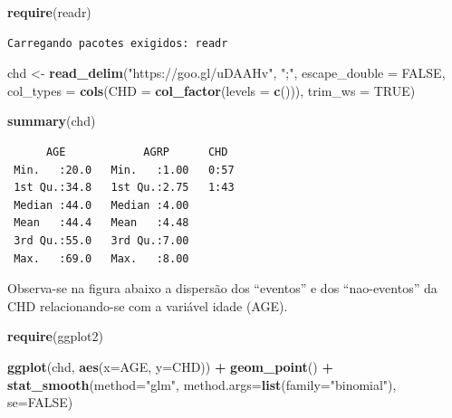 \documentclass[12pt,brazil,oneside]{book}
\newenvironment{Shaded}{\begin{snugshade}}{\end{snugshade}}
\newcommand{\DataTypeTok}[1]{\textcolor[rgb]{0.13,0.29,0.53}{#1}}
\newcommand{\KeywordTok}[1]{\textcolor[rgb]{0.13,0.29,0.53}{\textbf{#1}}}
\newcommand{\NormalTok}[1]{#1}
\newcommand{\OperatorTok}[1]{\textcolor[rgb]{0.81,0.36,0.00}{\textbf{#1}}}
\newcommand{\OtherTok}[1]{\textcolor[rgb]{0.56,0.35,0.01}{#1}}
\newcommand{\StringTok}[1]{\textcolor[rgb]{0.31,0.60,0.02}{#1}}
\begin{document}
\begin{Shaded}
\begin{Highlighting}[]
\KeywordTok{require}\NormalTok{(readr)}
\end{Highlighting}
\end{Shaded}

\begin{verbatim}
Carregando pacotes exigidos: readr
\end{verbatim}

\begin{Shaded}
\begin{Highlighting}[]
\NormalTok{chd <-}\StringTok{ }\KeywordTok{read_delim}\NormalTok{(}\StringTok{"https://goo.gl/uDAAHv"}\NormalTok{, }
    \StringTok{";"}\NormalTok{, }\DataTypeTok{escape_double =} \OtherTok{FALSE}\NormalTok{, }\DataTypeTok{col_types =} \KeywordTok{cols}\NormalTok{(}\DataTypeTok{CHD =} \KeywordTok{col_factor}\NormalTok{(}\DataTypeTok{levels =} \KeywordTok{c}\NormalTok{())), }
    \DataTypeTok{trim_ws =} \OtherTok{TRUE}\NormalTok{)}

\KeywordTok{summary}\NormalTok{(chd)}
\end{Highlighting}
\end{Shaded}

\begin{verbatim}
      AGE            AGRP      CHD   
 Min.   :20.0   Min.   :1.00   0:57  
 1st Qu.:34.8   1st Qu.:2.75   1:43  
 Median :44.0   Median :4.00         
 Mean   :44.4   Mean   :4.48         
 3rd Qu.:55.0   3rd Qu.:7.00         
 Max.   :69.0   Max.   :8.00         
\end{verbatim}

Observa-se na figura abaixo a dispersão dos ``eventos'' e dos
``nao-eventos'' da CHD relacionando-se com a variável idade (AGE).

\begin{Shaded}
\begin{Highlighting}[]
\KeywordTok{require}\NormalTok{(ggplot2)}

\KeywordTok{ggplot}\NormalTok{(chd, }\KeywordTok{aes}\NormalTok{(}\DataTypeTok{x=}\NormalTok{AGE, }\DataTypeTok{y=}\NormalTok{CHD)) }\OperatorTok{+}\StringTok{ }
\StringTok{  }\KeywordTok{geom_point}\NormalTok{() }\OperatorTok{+}\StringTok{ }
\StringTok{  }\KeywordTok{stat_smooth}\NormalTok{(}\DataTypeTok{method=}\StringTok{"glm"}\NormalTok{, }\DataTypeTok{method.args=}\KeywordTok{list}\NormalTok{(}\DataTypeTok{family=}\StringTok{"binomial"}\NormalTok{), }\DataTypeTok{se=}\OtherTok{FALSE}\NormalTok{)}
\end{Highlighting}
\end{Shaded}
\end{document}
